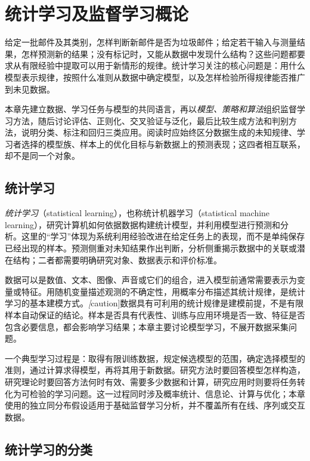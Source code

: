 \setcounter{chapter}{0} %
\chapter{统计学习及监督学习概论}
\label{chap:lh-learning-overview}

给定一批邮件及其类别，怎样判断新邮件是否为垃圾邮件；给定若干输入与测量结果，怎样预测新的结果；没有标记时，又能从数据中发现什么结构？这些问题都要求从有限经验中提取可以用于新情形的规律。统计学习关注的核心问题是：用什么模型表示规律，按照什么准则从数据中确定模型，以及怎样检验所得规律能否推广到未见数据。

本章先建立数据、学习任务与模型的共同语言，再以\emph{模型、策略和算法}组织监督学习方法，随后讨论评估、正则化、交叉验证与泛化，最后比较生成方法和判别方法，说明分类、标注和回归三类应用。阅读时应始终区分数据生成的未知规律、学习者选择的模型族、样本上的优化目标与新数据上的预测表现；这四者相互联系，却不是同一个对象。

\section{统计学习}
\label{sec:lh-statistical-learning}

\emph{统计学习}（statistical learning），也称统计机器学习（statistical machine learning），研究计算机如何依据数据构建统计模型，并利用模型进行预测和分析。这里的“学习”体现为系统利用经验改进在给定任务上的表现，而不是单纯保存已经出现的样本。预测侧重对未知结果作出判断，分析侧重揭示数据中的关联或潜在结构；二者都需要明确研究对象、数据表示和评价标准。

数据可以是数值、文本、图像、声音或它们的组合，进入模型前通常需要表示为变量或特征。用随机变量描述观测的不确定性，用概率分布描述其统计规律，是统计学习的基本建模方式。\emph[caution]{数据具有可利用的统计规律是建模前提，不是有限样本自动保证的结论。}样本是否具有代表性、训练与应用环境是否一致、特征是否包含必要信息，都会影响学习结果；本章主要讨论模型学习，不展开数据采集问题。

一个典型学习过程是：取得有限训练数据，规定候选模型的范围，确定选择模型的准则，通过计算求得模型，再将其用于新数据。研究方法时要回答模型怎样构造，研究理论时要回答方法何时有效、需要多少数据和计算，研究应用时则要将任务转化为可检验的学习问题。这一过程同时涉及概率统计、信息论、计算与优化；本章使用的独立同分布假设适用于基础监督学习分析，并不覆盖所有在线、序列或交互数据。

\section{统计学习的分类}
\label{sec:lh-learning-categories}

